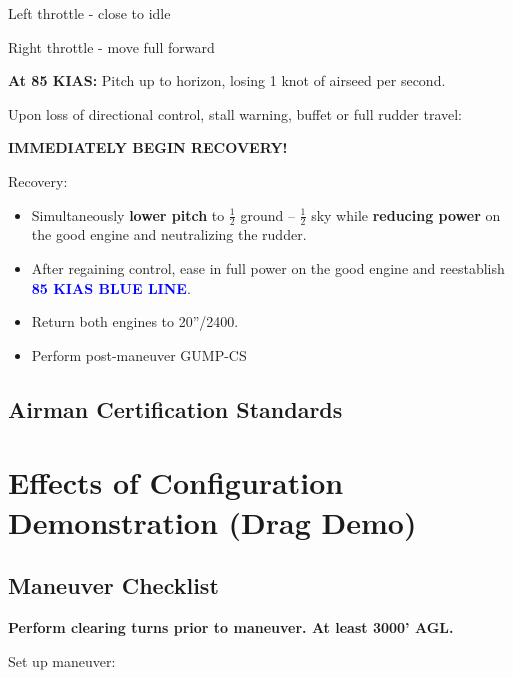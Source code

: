 {Left throttle - close to idle

Right throttle - move full forward

\textbf{At 85 KIAS:} Pitch up to horizon, losing 1 knot of airseed per second.

Upon loss of directional control, stall warning, buffet or full rudder travel:

\textbf{IMMEDIATELY BEGIN RECOVERY!}

Recovery:
\begin{itemize}[label={}]
\item Simultaneously \textbf{lower pitch} to $\frac{1}{2}$ ground – $\frac{1}{2}$ sky while \textbf{reducing power} on the good engine and neutralizing the rudder.
\item After regaining control, ease in full power on the good engine and reestablish \textbf{\textcolor{blue}{85 KIAS BLUE LINE}}.
\item Return both engines to 20''/2400.
\item Perform post-maneuver GUMP-CS
\end{itemize}

\subsection{Airman Certification Standards}
\newpage

\section{Effects of Configuration Demonstration (Drag Demo)}
\subsection{Maneuver Checklist}

\textbf{Perform clearing turns prior to maneuver. At least 3000' AGL.}

Set up maneuver:

}
